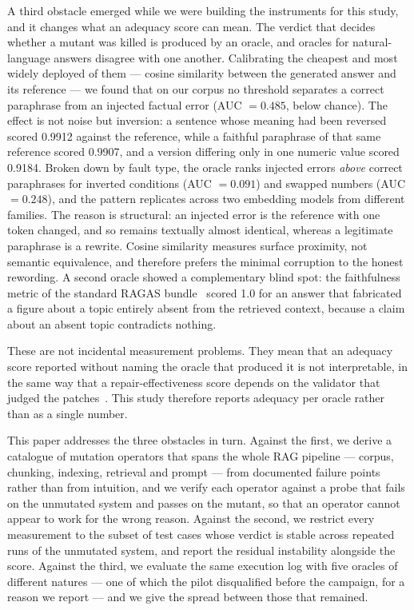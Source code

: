 \documentclass[a4paper,fleqn]{cas-dc}
\begin{document}
A third obstacle emerged while we were building the instruments for this study,
and it changes what an adequacy score can mean. The verdict that decides whether
a mutant was killed is produced by an oracle, and oracles for natural-language
answers disagree with one another. Calibrating the cheapest and most widely
deployed of them --- cosine similarity between the generated answer and its
reference --- we found that on our corpus no threshold separates a correct
paraphrase from an injected factual error (AUC $=0.485$, below chance). The
effect is not noise but inversion: a sentence whose meaning had been reversed
scored 0.9912 against the reference, while a faithful paraphrase of that same
reference scored 0.9907, and a version differing only in one numeric value
scored 0.9184. Broken down by fault type, the oracle ranks injected errors
\emph{above} correct paraphrases for inverted conditions (AUC $=0.091$) and
swapped numbers (AUC $=0.248$), and the pattern replicates across two embedding
models from different families. The reason is structural: an injected error is
the reference with one token changed, and so remains textually almost
identical, whereas a legitimate paraphrase is a rewrite. Cosine similarity
measures surface proximity, not semantic equivalence, and therefore prefers the
minimal corruption to the honest rewording. A second oracle showed a
complementary blind spot: the faithfulness metric of the standard RAGAS
bundle~\cite{es2024ragas} scored 1.0 for an answer that fabricated a figure
about a topic entirely absent from the retrieved context, because a claim about
an absent topic contradicts nothing.

These are not incidental measurement problems. They mean that an adequacy score
reported without naming the oracle that produced it is not interpretable, in the
same way that a repair-effectiveness score depends on the validator that judged
the patches~\cite{bonfim2026evaluator}. This study therefore reports adequacy
per oracle rather than as a single number.

This paper addresses the three obstacles in turn. Against the first, we derive
a catalogue of mutation operators that spans the whole RAG pipeline --- corpus,
chunking, indexing, retrieval and prompt --- from documented failure points
rather than from intuition, and we verify each operator against a probe that
fails on the unmutated system and passes on the mutant, so that an operator
cannot appear to work for the wrong reason. Against the second, we restrict
every measurement to the subset of test cases whose verdict is stable across
repeated runs of the unmutated system, and report the residual instability
alongside the score. Against the third, we evaluate the same execution log with
five oracles of different natures --- one of which the pilot disqualified
before the campaign, for a reason we report --- and we give the spread between
those that remained.
\end{document}
